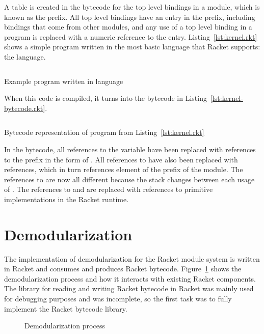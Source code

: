 A table is created in the bytecode for the top level bindings in a module, which is known as the prefix.
All top level bindings have an entry in the prefix, including bindings that come from other modules, and any use of a top level binding in a program is replaced with a numeric reference to the entry.
Listing~\ref{lst:kernel.rkt} shows a simple program written in the most basic language that Racket supports: the  language.
\begin{listing}
  \inputminted{racket}{listings/kernel.rkt}
  \caption{Example program written in  language}
  \label{lst:kernel.rkt}
\end{listing}
When this code is compiled, it turns into the bytecode in Listing~\ref{lst:kernel-bytecode.rkt}. 
\begin{listing}
  \inputminted{racket}{listings/kernel-bytecode.rkt}
  \caption{Bytecode representation of program from Listing~\ref{lst:kernel.rkt}}
  \label{lst:kernel-bytecode.rkt}
\end{listing}

In the bytecode, all references to the variable  have been replaced with references to the prefix in the form of . 
All references to  have also been replaced with  references, which in turn references element  of the prefix of the  module.
The references to  are now all different because the stack changes between each usage of .
The references to  and \racket{+} are replaced with references to primitive implementations in the Racket runtime. 

\section{Demodularization}

The implementation of demodularization for the Racket module system is written in Racket and consumes and produces Racket bytecode.
Figure~\ref{fig:demod} shows the demodularization process and how it interacts with existing Racket components.
The library for reading and writing Racket bytecode in Racket was mainly used for debugging purposes and was incomplete, so the first task was to fully implement the Racket bytecode library.
\begin{figure}
  
  \label{fig:demod}
  \caption{Demodularization process}
\end{figure}

